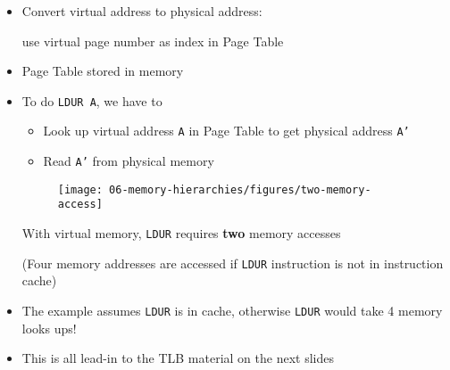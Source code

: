 \begin{frame}[fragile]
\begin{itemize}
	\item Convert virtual address to physical address: 

		use virtual page number as index in Page Table
	\item Page Table stored in memory
	\item To do \texttt{LDUR A}, we have to
	\begin{itemize}
		\item Look up virtual address \texttt{A} in Page Table to get
			physical address \texttt{A'}
		\item Read \texttt{A'} from physical memory
	\end{itemize}
\begin{figure}[H]
\centering
	{\texttt{[image: 06-memory-hierarchies/figures/two-memory-access]}}
\end{figure}
	With virtual memory, \texttt{LDUR} requires {\bf two} memory accesses

	(Four memory addresses are accessed if \texttt{LDUR} instruction is not in instruction cache)
\end{itemize}
\BNotes\ifnum{}
\begin{itemize}
\item The example assumes \texttt{LDUR} is in cache, otherwise \texttt{LDUR} would
	take 4 memory looks ups!
\item This is all lead-in to the TLB material on the next slides
\end{itemize}
\fi\ENotes
\end{frame}


